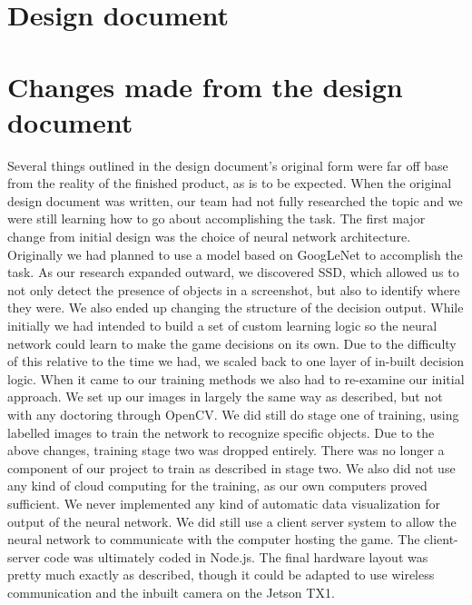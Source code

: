 \documentclass[onecolumn, draftclsnofoot,10pt, compsoc]{IEEEtran}
\begin{document}
\section{Design document}



\section{Changes made from the design document}
Several things outlined in the design document's original form were far off base from the reality of the finished product, as is to be expected.
When the original design document was written, our team had not fully researched the topic and we were still learning how to go about accomplishing the task. 
The first major change from initial design was the choice of neural network architecture. 
Originally we had planned to use a model based on GoogLeNet to accomplish the task.
As our research expanded outward, we discovered SSD, which allowed us to not only detect the presence of objects in a screenshot, but also to identify where they were.
We also ended up changing the structure of the decision output.
While initially we had intended to build a set of custom learning logic so the neural network could learn to make the game decisions on its own.
Due to the difficulty of this relative to the time we had, we scaled back to one layer of in-built decision logic.
\newline\newline
When it came to our training methods we also had to re-examine our initial approach.
We set up our images in largely the same way as described, but not with any doctoring through OpenCV.
We did still do stage one of training, using labelled images to train the network to recognize specific objects.
Due to the above changes, training stage two was dropped entirely.
There was no longer a component of our project to train as described in stage two.
We also did not use any kind of cloud computing for the training, as our own computers proved sufficient.
\newline\newline
We never implemented any kind of automatic data visualization for output of the neural network.
We did still use a client server system to allow the neural network to communicate with the computer hosting the game.
The client-server code was ultimately coded in Node.js.
The final hardware layout was pretty much exactly as described, though it could be adapted to use wireless communication and the inbuilt camera on the Jetson TX1.
\end{document}
